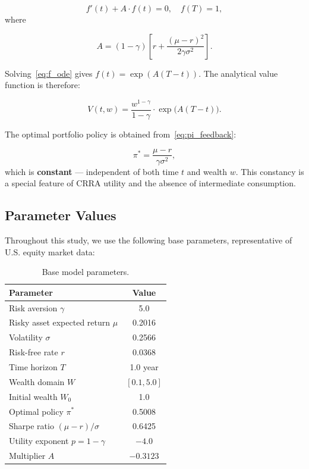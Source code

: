 \documentclass[12pt,a4paper]{article}
\begin{document}
\begin{equation}
\label{eq:f_ode}
f'(t) + A \cdot f(t) = 0, \quad f(T) = 1,
\end{equation}
where

\begin{equation}
\label{eq:A_coefficient}
A = (1-\gamma) \left[ r + \frac{(\mu - r)^2}{2 \gamma \sigma^2} \right].
\end{equation}

Solving~\eqref{eq:f_ode} gives $f(t) = \exp(A(T - t))$. The analytical value function is therefore:

\begin{equation}
\label{eq:analytical_V}
V(t, w) = \frac{w^{1-\gamma}}{1-\gamma} \cdot \exp\bigl( A (T - t) \bigr).
\end{equation}

The optimal portfolio policy is obtained from~\eqref{eq:pi_feedback}:

\begin{equation}
\label{eq:analytical_pi}
\pi^* = \frac{\mu - r}{\gamma \sigma^2},
\end{equation}
which is \textbf{constant} --- independent of both time $t$ and wealth $w$. This constancy is a special feature of CRRA utility and the absence of intermediate consumption.

\subsection{Parameter Values}

Throughout this study, we use the following base parameters, representative of U.S. equity market data:

\begin{table}[H]
\centering
\caption{Base model parameters.}
\label{tab:parameters}
\begin{tabular}{lc}
\toprule
\textbf{Parameter} & \textbf{Value} \\
\midrule
Risk aversion $\gamma$ & 5.0 \\
Risky asset expected return $\mu$ & 0.2016 \\
Volatility $\sigma$ & 0.2566 \\
Risk-free rate $r$ & 0.0368 \\
Time horizon $T$ & 1.0 year \\
Wealth domain $W$ & $[0.1, 5.0]$ \\
Initial wealth $W_0$ & 1.0 \\
\midrule
Optimal policy $\pi^*$ & 0.5008 \\
Sharpe ratio $(\mu - r)/\sigma$ & 0.6425 \\
Utility exponent $p = 1 - \gamma$ & $-4.0$ \\
Multiplier $A$ & $-0.3123$ \\
\bottomrule
\end{tabular}
\end{table}
\end{document}
